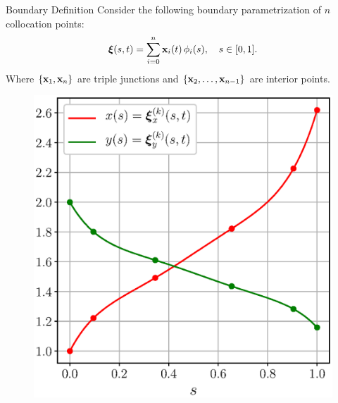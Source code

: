 \documentclass[usenames,dvipsnames]{beamer}
\begin{document}
\begin{frame}{Boundary Definition}
Consider the following boundary parametrization of $n$ collocation points:
\begin{equation*}
    \vxi(s,t) = \sum_{i=0}^n \x_i(t)\,\phi_i(s),\quad s \in [0, 1].
\end{equation*}
Where $\{\x_1,\x_n\}$ are triple junctions and $\{\x_2, \ldots, \x_{n-1}\}$ are interior points.
\vspace{-0.5em}
\begin{figure}
    \centering
    \begin{minipage}[t]{0.5\textwidth}
    \centering
    \includegraphics[scale=0.36,trim={0 0 0 3em},clip=true]{figures/coupled_model/xsys.eps}
    \end{minipage}%
    \begin{minipage}[t]{0.5\textwidth}
    \centering

\end{minipage}
\end{figure}
\end{frame}
\end{document}

